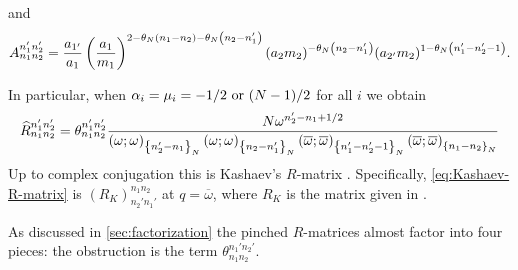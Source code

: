 \documentclass{sl2ams}
\numberwithin{equation}{section}
\begin{document}
\begin{theorem}
\begin{thmenum}
\[{      }
    \]
    and
    \[
      A_{n_1 n_2}^{n_1' n_2'}
      =
      \frac{a_{1'}}{a_1}
      \left( \frac{a_1}{ m_1} \right)^{2 - \theta_{N}\mathopen{}\left(n_1 - n_2\right) - \theta_{N}\mathopen{}\left(n_2 - n_1'\right)}
      (a_2 m_2)^{- \theta_{N}\mathopen{}\left(n_2 - n_1'\right)}
      (a_{2'} m_2)^{1- \theta_{N}\mathopen{}\left(n_1' - n_2' - 1\right)}
      .
    \]
  \item
    \label{thm:R-mat-pinched:Kashaev}
    In particular, when \(\alpha_i = \mu_i = -1/2 \text{ or } (N - 1)/2\) for all \(i\) we obtain
    \begin{equation}
      \label{eq:Kashaev-R-matrix}
      \rmat{n_1}{n_2}{n_1'}{n_2'} 
      =
      \theta_{n_1 n_2}^{n_1' n_2'}
      \frac{
        \nr
        \omega^{
          n_2' - n_1
          +1/2
        }
        }{
        \qp{\omega}{\modb{n_2' - n_1}}
        \qp{\omega}{\modb{n_2 - n_1'}}
        \qp{\overline{\omega}}[\overline{\omega}]{\modb{n_1' - n_2' - 1}}
        \qp{\overline{\omega}}[\overline{\omega}]{\modb{n_1 - n_2}}
      }
    \end{equation}
    Up to complex conjugation this is Kashaev's \(R\)-matrix \cite{Kashaev1995}.
    Specifically, \eqref{eq:Kashaev-R-matrix} is \((R_K)_{n_2' n_1'}^{n_1 n_2}\) at \(q = \overline{\omega}\), where \(R_K\) is the matrix given in \cite[Section 4.1]{Murakami2018} .
    \qedhere
  \end{thmenum}
\end{theorem}

As discussed in \cref{sec:factorization} the pinched \(R\)-matrices almost factor into four pieces: the obstruction is the term \(\theta_{n_1 n_2}^{n_1' n_2'}\).
\end{document}
